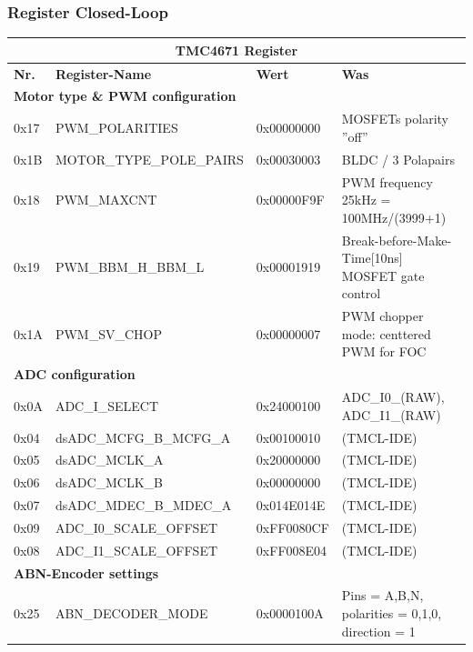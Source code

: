 \subsubsection{Register Closed-Loop}\label{Appendix:ABN_Register}

\begin{table}[H]
\begin{tabularx}{\linewidth}{|l|l|l|X|}
\hline
\multicolumn{4}{|c|}{\textbf{TMC4671 Register}}               \\ \hline
\textbf{Nr. }& \textbf{Register-Name   }   & \textbf{Wert }      & \textbf{Was} \\ \hline
\multicolumn{4}{|l|}{\textbf{Motor type \&  PWM configuration}}        \\ \hline
0x17         & PWM\_POLARITIES             & 0x00000000 & MOSFETs polarity ''off''    \\ \hline
0x1B         & MOTOR\_TYPE\_POLE\_PAIRS & 0x00030003 & BLDC / 3 Polapairs    \\ \hline
0x18         & PWM\_MAXCNT                 & 0x00000F9F & PWM frequency 25kHz = 100MHz/(3999+1)   \\ \hline
0x19         & PWM\_BBM\_H\_BBM\_L         & 0x00001919 & Break-before-Make-Time[10ns] MOSFET gate control \\ \hline
0x1A         & PWM\_SV\_CHOP               & 0x00000007 & PWM chopper mode: centtered PWM for FOC \\ \hline
\multicolumn{4}{|l|}{\textbf{ADC configuration}}                       \\ \hline
0x0A         & ADC\_I\_SELECT              & 0x24000100 & ADC\_I0\_(RAW), ADC\_I1\_(RAW)    \\ \hline
0x04         & dsADC\_MCFG\_B\_MCFG\_A     & 0x00100010 & (TMCL-IDE)    \\ \hline
0x05         & dsADC\_MCLK\_A              & 0x20000000 & (TMCL-IDE)    \\ \hline
0x06         & dsADC\_MCLK\_B              & 0x00000000 & (TMCL-IDE)    \\ \hline
0x07         & dsADC\_MDEC\_B\_MDEC\_A     & 0x014E014E & (TMCL-IDE)    \\ \hline
0x09         & ADC\_I0\_SCALE\_OFFSET      & 0xFF0080CF & (TMCL-IDE)    \\ \hline
0x08         & ADC\_I1\_SCALE\_OFFSET      & 0xFF008E04 & (TMCL-IDE)    \\ \hline
\multicolumn{4}{|l|}{\textbf{ABN-Encoder settings}}           \\ \hline
0x25         & ABN\_DECODER\_MODE            & 0x0000100A & Pins = A,B,N, polarities = 0,1,0, direction = 1    \\ \hline

\end{tabularx}
\end{table}

